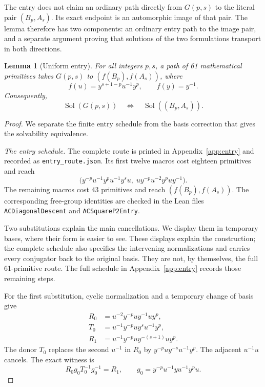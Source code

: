 \documentclass[11pt]{article}
\newtheorem{lemma}[theorem]{Lemma}
\theoremstyle{definition}\newtheorem{definition}[theorem]{Definition}
\theoremstyle{remark}\newtheorem{remark}[theorem]{Remark}
\newcommand{\Sol}{\operatorname{Sol}}
\begin{document}
The entry does not claim an ordinary path directly from $G(p,s)$ to the literal pair $(B_p,A_s)$. Its exact endpoint is an automorphic image of that pair. The lemma therefore has two components: an ordinary entry path to the image pair, and a separate argument proving that solutions of the two formulations transport in both directions.

\begin{lemma}[Uniform entry]\label{lem:entry}
For all integers $p,s$, a path of 61 mathematical primitives takes $G(p,s)$ to $(f(B_p),f(A_s))$, where
\[
f(u)=y^{s+1-p}u^{-1}y^p,\qquad f(y)=y^{-1}.
\]
Consequently,
\[
\Sol(G(p,s))\quad\Longleftrightarrow\quad\Sol((B_p,A_s)).
\]
\end{lemma}
\begin{proof}
We separate the finite entry schedule from the basis correction that gives the solvability equivalence.

\emph{The entry schedule.} The complete route is printed in Appendix~\ref{app:entry} and recorded as \texttt{entry\_route.json}. Its first twelve macros cost eighteen primitives and reach
\[
\bigl(y^{-p}u^{-1}y^pu^{-1}y^su,\;uy^{-p}u^{-2}y^puy^{-1}\bigr).
\]
The remaining macros cost 43 primitives and reach $(f(B_p),f(A_s))$. The corresponding free-group identities are checked in the Lean files \texttt{ACDiagonalDescent} and \texttt{ACSquareP2Entry}.

Two substitutions explain the main cancellations. We display them in temporary bases, where their form is easier to see. These displays explain the construction; the complete schedule also specifies the intervening normalizations and carries every conjugator back to the original basis. They are not, by themselves, the full 61-primitive route. The full schedule in Appendix~\ref{app:entry} records those remaining steps.

For the first substitution, cyclic normalization and a temporary change of basis give
\[
\begin{aligned}
R_0&=u^{-2}y^{-p}uy^{-1}uy^p,\\
T_0&=u^{-1}y^{-p}uy^su^{-1}y^p,\\
R_1&=u^{-1}y^{-p}uy^{-(s+1)}uy^p.
\end{aligned}
\]
The donor $T_0$ replaces the second $u^{-1}$ in $R_0$ by $y^{-p}uy^{-s}u^{-1}y^p$. The adjacent $u^{-1}u$ cancels. The exact witness is
\[
R_0g_0T_0^{-1}g_0^{-1}=R_1,\qquad
 g_0=y^{-p}u^{-1}yu^{-1}y^pu.
\]


\end{proof}
\end{document}
